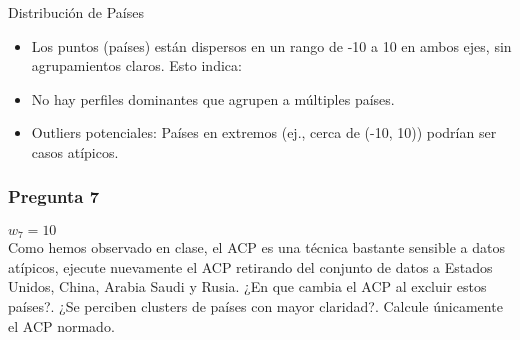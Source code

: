 \documentclass[
]{article}
\begin{document}
Distribución de Países

\begin{itemize}
\item
  Los puntos (países) están dispersos en un rango de -10 a 10 en ambos
  ejes, sin agrupamientos claros. Esto indica:
\item
  No hay perfiles dominantes que agrupen a múltiples países.
\item
  Outliers potenciales: Países en extremos (ej., cerca de (-10, 10))
  podrían ser casos atípicos.
\end{itemize}

\subsubsection{Pregunta 7}\label{pregunta-7}

\(w_7=10\)\\
Como hemos observado en clase, el ACP es una técnica bastante sensible a
datos atípicos, ejecute nuevamente el ACP retirando del conjunto de
datos a Estados Unidos, China, Arabia Saudi y Rusia. ¿En que cambia el
ACP al excluir estos países?. ¿Se perciben clusters de países con mayor
claridad?. Calcule únicamente el ACP normado.
\end{document}
